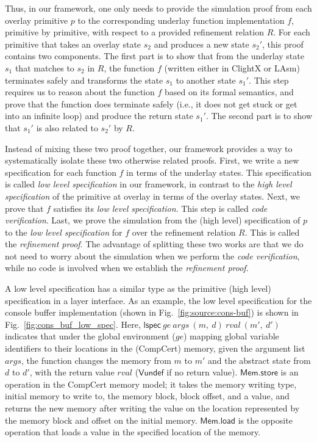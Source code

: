 Thus, in our framework, one only needs to provide the simulation proof
from each overlay primitive $p$ to the corresponding underlay function
implementation $f$, primitive by primitive, with respect to a provided
refinement relation $R$. For each primitive that takes an overlay state
$s_2$ and produces a new state $s_2'$, this proof contains two components.
The first part is to show that from the underlay state $s_1$ that matches to
$s_2$ in $R$, the function $f$ (written either in ClightX or LAsm)
terminates safely and transforms the state $s_1$ to another state $s_1'$.
This step requires us to reason about the function $f$ based on its formal
semantics, and prove that the function does terminate safely (i.e., it
does not get stuck or get into an infinite loop) and produce the return state
$s_1'$. The second part is to show that $s_1'$ is also related to $s_2'$ by $R$.

Instead of mixing these two proof together, our framework provides a way to
systematically isolate these two otherwise related proofs. First, we write
a new specification for each function $f$ in terms of the underlay states.
This specification is called {\em low level specification} in our framework,
in contrast to the {\em high level specification} of the primitive at overlay
in terms of the overlay states. Next, we prove that $f$ satisfies its
{\em low level specification}. This step is called {\em code verification}.
Last, we prove the simulation from the (high level) specification of $p$ to the
{\em low level specification} for $f$ over the refinement relation $R$.
This is called the {\em refinement proof}. The advantage of splitting these
two works are that we do not need to worry about the simulation when we
perform the {\em code verification}, while no code is involved when
we establish the {\em refinement proof}.

A low level specification has a similar type as the primitive
(high level) specification in a layer interface.
As an example, the low level specification for the console buffer
implementation (shown in Fig.~\ref{fig:source:cons-buf}) is shown
in Fig.~\ref{fig:cons_buf_low_spec}.
Here, $\textsf{lspec}~ ge~ args~ (m,~d)~ rval~ (m',~d')$
indicates that under the global environment ($ge$) mapping global variable
identifiers to their locations in the (CompCert) memory, given the argument list
$args$, the function changes the memory from $m$ to $m'$ and the abstract
state from $d$ to $d'$, with the return value
$rval$ ($\textsf{Vundef}$ if no return value). $\textsf{Mem.store}$ is an
operation in the CompCert memory model;  it takes the memory writing type, initial
memory to write to, the memory block, block offset, and a value, and returns the
new memory after writing the value on the location represented by the memory
block and offset on the initial memory. $\textsf{Mem.load}$ is the opposite
operation that loads a value in the specified location of the memory.

